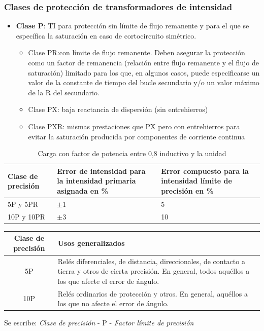 \subsubsection{Clases de protección de transformadores de intensidad}
\begin{itemize}
	\item \textbf{Clase P}: TI para protección sin límite de flujo remanente y para el que se específica la saturación en caso de cortocircuito simétrico.
	\begin{itemize}
		\item Clase PR:con límite de flujo remanente. Deben asegurar la protección como un factor de remanencia (relación entre flujo remanente y el flujo de saturación) limitado para los que, en algunos casos, puede especificarse un valor de la constante de tiempo del bucle secundario y/o un valor máximo de la R del secundario. 
		\item Clase PX: baja reactancia de dispersión (sin entrehierros)
		\item Clase PXR: mismas prestaciones que PX pero con entrehierros para evitar la saturación producida por componentes de corriente continua
	\end{itemize}
\end{itemize}
\begin{table}[H]
	\centering
	\begin{tabular}{|p{3cm}|p{3cm}|p{3cm}|}
		\hline
		\textbf{Clase de precisión} & \textbf{Error de intensidad para la intensidad primaria asignada en \%} &  \textbf{Error compuesto para la intensidad límite de precisión en \%} \\ \hline
		5P y 5PR & $\pm 1$ & 5 \\ \hline
		10P y 10PR & $\pm 3$ & 10 \\ \hline
	\end{tabular}
	\caption{Carga con factor de potencia entre 0,8 inductivo y la unidad}
	\label{tab:precision}
\end{table}
\begin{table}[H]
	\centering
	\begin{tabular}{|c|p{10cm}|}
		\hline
		\textbf{Clase de precisión} & \textbf{Usos generalizados} \\ \hline
		5P & Relés diferenciales, de distancia, direccionales, de contacto a tierra y otros de cierta precisión. En general, todos aquéllos a los que afecte el error de ángulo. \\ \hline
		10P & Relés ordinarios de protección y otros. En general, aquéllos a los que no afecte el error de ángulo. \\ \hline
	\end{tabular}
	\label{tab:usos_precision}
\end{table}
Se escribe: \textit{Clase de precisión} - P - \textit{Factor límite de precisión}


